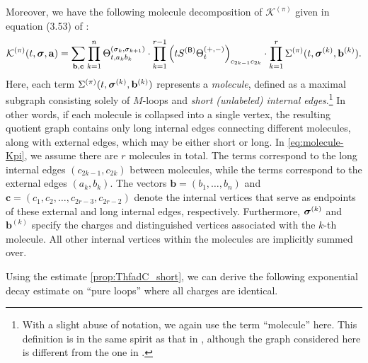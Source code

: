 Moreover, we have the following molecule decomposition of $\mathcal{K}^{(\pi)}$ given in equation (3.53) of \cite{YY_25}:
\begin{equation}\label{eq:molecule-Kpi}
    \mathcal{K}^{(\pi)}(t, {\boldsymbol{\sigma}}, \mathbf{a}) = \sum_{\mathbf{b},\mathbf{c}} \prod_{k=1}^n \Theta^{(\sigma_k,\sigma_{k+1})}_{t,a_k b_k} \cdot \prod_{k=1}^{r-1} \left(tS^{({\mathsf{B}})} \Theta_t^{(+,-)}\right)_{c_{2k-1} c_{2k}} \cdot \prod_{k=1}^r \Sigma^{(\pi)}(t, {\boldsymbol{\sigma}}^{(k)}, \mathbf{b}^{(k)}).
\end{equation}
Here, each term $\Sigma^{(\pi)}(t, {\boldsymbol{\sigma}}^{(k)}, \mathbf{b}^{(k)})$ represents a \emph{molecule}, defined as a maximal subgraph consisting solely of $M$-loops and \emph{short (unlabeled) internal edges}.\footnote{
With a slight abuse of notation, we again use the term ``molecule'' here. This definition is in the same spirit as that in , although the graph considered here is different from the one in .
} 
In other words, if each molecule is collapsed into a single vertex, the resulting quotient graph contains only long internal edges connecting different molecules, along with external edges, which may be either short or long. 
In \eqref{eq:molecule-Kpi}, we assume there are $r$ molecules in total. The terms  correspond to the long internal edges $(c_{2k-1},c_{2k})$ between molecules, while the terms  correspond to the external edges $(a_k,b_k)$. The vectors $\mathbf b=(b_1,\ldots, b_n)$ and $\mathbf c=(c_1, c_2,\ldots, c_{2r-3},c_{2r-2})$ denote the internal vertices that serve as endpoints of these external and long internal edges, respectively. Furthermore, ${\boldsymbol{\sigma}}^{(k)}$ and $ \mathbf{b}^{(k)}$ specify the charges and distinguished vertices associated with the $k$-th molecule. All other internal vertices within the molecules are implicitly summed over.





Using the estimate \eqref{prop:ThfadC_short}, we can derive the following exponential decay estimate on ``pure loops'' where all charges are identical.



